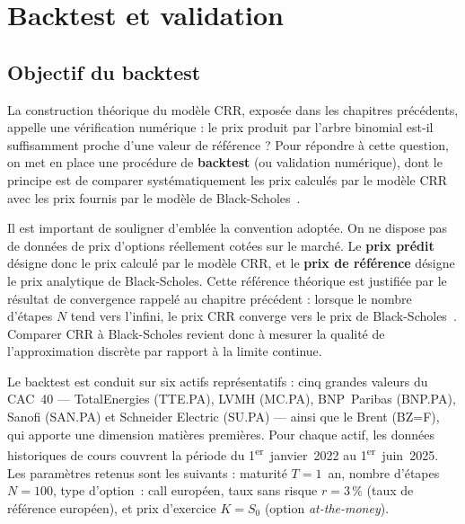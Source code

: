 \documentclass[11pt]{report}
\begin{document}


\chapter{Backtest et validation}

\section{Objectif du backtest}

La construction théorique du modèle CRR, exposée dans les chapitres
précédents, appelle une vérification numérique : le prix produit par
l'arbre binomial est-il suffisamment proche d'une valeur de référence ?
Pour répondre à cette question, on met en place une procédure de
\textbf{backtest} (ou validation numérique), dont le principe est de
comparer systématiquement les prix calculés par le modèle CRR avec les
prix fournis par le modèle de Black-Scholes~\cite{crr1979}.

Il est important de souligner d'emblée la convention adoptée. On ne
dispose pas de données de prix d'options réellement cotées sur le marché.
Le \textbf{prix prédit} désigne donc le prix calculé par le modèle CRR,
et le \textbf{prix de référence} désigne le prix analytique de
Black-Scholes. Cette référence théorique est justifiée par le résultat
de convergence rappelé au chapitre précédent : lorsque le nombre d'étapes
$N$ tend vers l'infini, le prix CRR converge vers le prix de
Black-Scholes~\cite{crr1979}. Comparer CRR à Black-Scholes revient donc
à mesurer la qualité de l'approximation discrète par rapport à la limite
continue.

Le backtest est conduit sur six actifs représentatifs : cinq grandes
valeurs du CAC~40 — TotalEnergies (TTE.PA), LVMH (MC.PA), BNP~Paribas
(BNP.PA), Sanofi (SAN.PA) et Schneider Electric (SU.PA) — ainsi que le
Brent (BZ=F), qui apporte une dimension matières premières. Pour chaque
actif, les données historiques de cours couvrent la période du
1\textsuperscript{er}~janvier~2022 au 1\textsuperscript{er}~juin~2025.
Les paramètres retenus sont les suivants : maturité $T = 1$~an, nombre
d'étapes $N = 100$, type d'option~: call européen, taux sans risque
$r = 3\,\%$ (taux de référence européen), et prix d'exercice $K = S_0$
(option \textit{at-the-money}).
\end{document}
